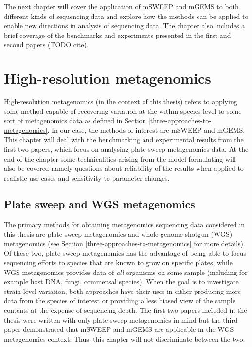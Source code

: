 \documentclass[officiallayout]{tktla}
\begin{document}
The next chapter will cover the application of mSWEEP and mGEMS to
both different kinds of sequencing data and explore how the methods
can be applied to enable new directions in analysis of sequencing
data. The chapter also includes a brief coverage of the benchmarks and
experiments presented in the first and second papers (TODO cite).

\chapter{High-resolution metagenomics}

High-resolution metagenomics (in the context of this thesis) refers to
applying some method capable of recovering variation at the
within-species level to some sort of metagenomics data as defined in
Section \ref{three-approaches-to-metagenomics}. In our case, the
methods of interest are mSWEEP and mGEMS. This chapter will deal with
the benchmarking and experimental results from the first two papers,
which focus on analysing plate sweep metagenomics data. At the end of
the chapter some technicalities arising from the model formulating will
also be covered \textemdash namely questions about reliability of the
results when applied to realistic use-cases and sensitivity to
parameter changes.

\section{Plate sweep and WGS metagenomics}

The primary methods for obtaining metagenomics sequencing data
considered in this thesis are plate sweep metagenomics and
whole-genome shotgun (WGS) metagenomics (see Section
\ref{three-approaches-to-metagenomics} for more details). Of these
two, plate sweep metagenomics has the advantage of being able to focus
sequencing efforts to species that are known to grow on specific
plates, while WGS metagenomics provides data of \textit{all} organisms
on some sample (including for example host DNA, fungi, commensal
species). When the goal is to investigate strain-level variation, both
approaches have their uses in either producing more data from the
species of interest or providing a less biased view of the sample
contents at the expense of sequencing depth. The first two papers
included in the thesis were written with only plate sweep metagenomics
in mind but the third paper demonstrated that mSWEEP and mGEMS are
applicable in the WGS metagenomics context. Thus, this chapter will
not discriminate between the two.
\end{document}
